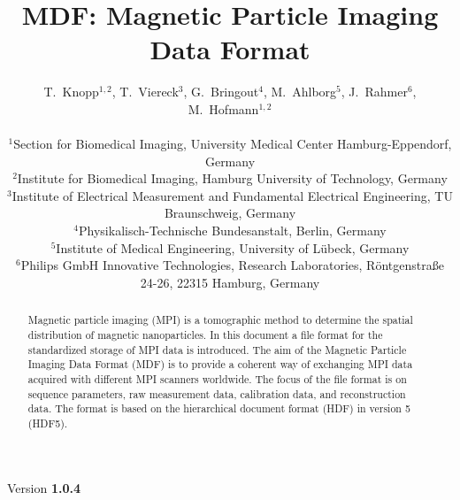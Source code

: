 \documentclass[landscape]{article} %
\begin{document}
\title{MDF: Magnetic Particle Imaging Data Format}
\newcommand{\version}{1.0.4}

\author{
T.~Knopp$^{1,2}$, T.~Viereck$^{3}$, G.~Bringout$^{4}$, M.~Ahlborg$^{5}$, J.~Rahmer$^6$, M.~Hofmann$^{1,2}$ \\ \\
$^1$Section for Biomedical Imaging, University Medical Center Hamburg-Eppendorf, Germany\\
$^2$Institute for Biomedical Imaging, Hamburg University of Technology, Germany\\
$^3$Institute of Electrical Measurement and Fundamental Electrical Engineering, TU Braunschweig, Germany\\
$^4$Physikalisch-Technische Bundesanstalt, Berlin, Germany\\
$^5$Institute of Medical Engineering, University of  Lübeck, Germany\\
$^6$Philips GmbH Innovative Technologies, Research Laboratories, Röntgenstraße 24-26, 22315 Hamburg, Germany
}


\maketitle
\begin{center}
Version \textbf{\version}
\end{center}

\begin{abstract}
Magnetic particle imaging (MPI) is a tomographic method to determine the spatial distribution of magnetic nanoparticles. In this document a file format for the standardized storage of MPI data is introduced. The aim of the Magnetic Particle Imaging Data Format (MDF) is to provide a coherent way of exchanging MPI data acquired with different MPI scanners worldwide. The focus of the file format is on sequence parameters, raw measurement data, calibration data, and reconstruction data. The format is based on the hierarchical document format (HDF) in version 5 (HDF5).
\end{abstract}
\end{document}
